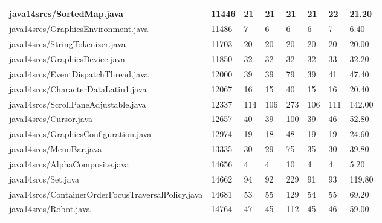 \begin{tabular}{|l|l|l|l|l|l|l|l|}
\hline
java14srcs/SortedMap.java                          & 11446       & 21        & 21        & 21        & 21        & 22        & 21.20     \\
\hline
java14srcs/GraphicsEnvironment.java                & 11486       & 7         & 6         & 6         & 6         & 7         & 6.40      \\
\hline
java14srcs/StringTokenizer.java                    & 11703       & 20        & 20        & 20        & 20        & 20        & 20.00     \\
\hline
java14srcs/GraphicsDevice.java                     & 11850       & 32        & 32        & 32        & 32        & 33        & 32.20     \\
\hline
java14srcs/EventDispatchThread.java                & 12000       & 39        & 39        & 79        & 39        & 41        & 47.40     \\
\hline
java14srcs/CharacterDataLatin1.java                & 12067       & 16        & 15        & 40        & 15        & 16        & 20.40     \\
\hline
java14srcs/ScrollPaneAdjustable.java               & 12337       & 114       & 106       & 273       & 106       & 111       & 142.00    \\
\hline
java14srcs/Cursor.java                             & 12657       & 40        & 39        & 100       & 39        & 46        & 52.80     \\
\hline
java14srcs/GraphicsConfiguration.java              & 12974       & 19        & 18        & 48        & 19        & 19        & 24.60     \\
\hline
java14srcs/MenuBar.java                            & 13335       & 30        & 29        & 75        & 35        & 30        & 39.80     \\
\hline
java14srcs/AlphaComposite.java                     & 14656       & 4         & 4         & 10        & 4         & 4         & 5.20      \\
\hline
java14srcs/Set.java                                & 14662       & 94        & 92        & 229       & 91        & 93        & 119.80    \\
\hline
java14srcs/ContainerOrderFocusTraversalPolicy.java & 14681       & 53        & 55        & 129       & 54        & 55        & 69.20     \\
\hline
java14srcs/Robot.java                              & 14764       & 47        & 45        & 112       & 45        & 46        & 59.00     \\

\end{tabular}
